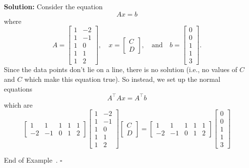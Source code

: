 \documentclass[10pt]{article}
\theoremstyle{definition}
\newtheorem{example}[theorem]{Example}
\renewenvironment{example}
{\begin{oldexample}}
  {\par\smallskip\hfill   End of Example~\theexample. $\square$    \par\end{oldexample}}
\newcommand{\vt}{\vskip 5mm} %
\newcommand{\Fl}{\vt\noindent\textbf} %
\newcommand{\1}[1]{\textbf{1}_{\left[#1\right]}} %
\begin{document}
\begin{example}
  \Fl{Solution:} Consider the equation
  \begin{equation*}
    Ax = b
  \end{equation*}
  where
  \begin{equation*}
    A =
    \begin{bmatrix}
      1&-2\\
      1&-1\\
      1&0\\
      1&1\\
      1&2
    \end{bmatrix},
    \quad
    x =
    \begin{bmatrix}
      C\\D
    \end{bmatrix},
    \quad \text{and} \quad
    b =
    \begin{bmatrix}
      0\\0\\1\\1\\3
    \end{bmatrix}.
  \end{equation*}
  Since the data points don't lie on a line, there is no solution (i.e., no
  values of $C$ and $C$ which make this equation true). So instead, we set up
  the normal equations
  \begin{equation*}
    A^{\top}Ax = A^{\top}b
  \end{equation*}
  which are
  \begin{equation*}
    \begin{bmatrix}
      1&1&1&1&1\\
      -2&-1&0&1&2
    \end{bmatrix}
    \begin{bmatrix}
      1&-2\\1&-1\\1&0\\1&1\\1&2
    \end{bmatrix}
    \begin{bmatrix}
      C\\D
    \end{bmatrix}
    =
    \begin{bmatrix}
      1&1&1&1&1\\
      -2&-1&0&1&2
    \end{bmatrix}
    \begin{bmatrix}
      0\\0\\1\\1\\3

\end{bmatrix}
\end{equation*}
\end{example}
\end{document}
